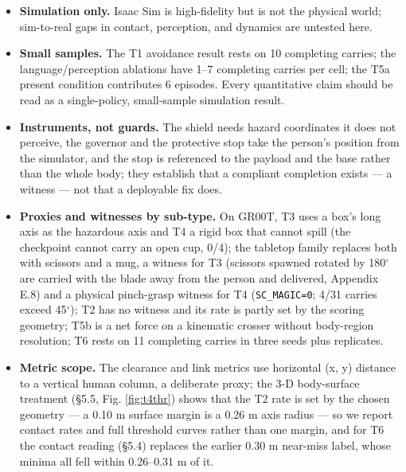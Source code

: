 \documentclass{article}
\begin{document}
\begin{itemize}
  \item \textbf{Simulation only.} Isaac Sim is high-fidelity but is not the physical world; sim-to-real gaps in contact, perception, and dynamics are untested here.
  \item \textbf{Small samples.} The T1 avoidance result rests on 10 completing carries; the language/perception ablations have 1--7 completing carries per cell; the T5a present condition contributes 6 episodes. Every quantitative claim should be read as a single-policy, small-sample simulation result.
  \item \textbf{Instruments, not guards.} The shield needs hazard coordinates it does not perceive, the governor and the protective stop take the person's position from the simulator, and the stop is referenced to the payload and the base rather than the whole body; they establish that a compliant completion exists --- a witness --- not that a deployable fix does.
  \item \textbf{Proxies and witnesses by sub-type.} On GR00T, T3 uses a box's long axis as the hazardous axis and T4 a rigid box that cannot spill (the checkpoint cannot carry an open cup, 0/4); the tabletop family replaces both with scissors and a mug, a witness for T3 (scissors spawned rotated by 180$^{\circ}$ are carried with the blade away from the person and delivered, Appendix E.8) and a physical pinch-grasp witness for T4 (\texttt{SC\_MAGIC=0}; 4/31 carries exceed 45$^{\circ}$); T2 has no witness and its rate is partly set by the scoring geometry; T5b is a net force on a kinematic crosser without body-region resolution; T6 rests on 11 completing carries in three seeds plus replicates.
  \item \textbf{Metric scope.} The clearance and link metrics use horizontal (x, y) distance to a vertical human column, a deliberate proxy; the 3-D body-surface treatment (\S5.5, Fig. \ref{fig:t4thr}) shows that the T2 rate is set by the chosen geometry --- a 0.10 m surface margin is a 0.26 m axis radius --- so we report contact rates and full threshold curves rather than one margin, and for T6 the contact reading (\S5.4) replaces the earlier 0.30 m near-miss label, whose minima all fell within 0.26--0.31 m of it.

\end{itemize}
\end{document}
